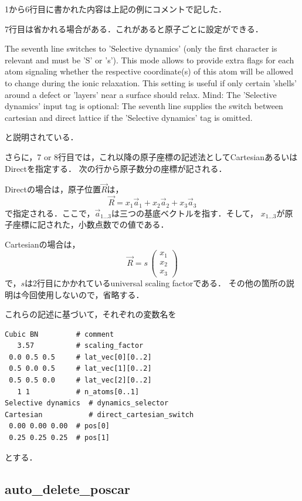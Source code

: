 \documentclass[11pt,dvipdfmx]{jsarticle}
\begin{document}
1から6行目に書かれた内容は上記の例にコメントで記した．

7行目は省かれる場合がある．これがあると原子ごとに設定ができる．

The seventh line switches to 'Selective dynamics' (only the first
character is relevant and must be 'S' or 's'). This mode allows to
provide extra flags for each atom signaling whether the respective
coordinate(s) of this atom will be allowed to change during the ionic
relaxation. This setting is useful if only certain 'shells' around a
defect or 'layers' near a surface should relax. Mind: The 'Selective
dynamics' input tag is optional: The seventh line supplies the switch
between cartesian and direct lattice if the 'Selective dynamics' tag is
omitted.

と説明されている．

さらに，7 or
8行目では，これ以降の原子座標の記述法としてCartesianあるいはDirectを指定する．
次の行から原子数分の座標が記される．

Directの場合は，原子位置\(\overrightarrow{R}\)は， \[
\overrightarrow{R} = x_1 \overrightarrow{a}_1 +
x_2 \overrightarrow{a}_2 +
x_3 \overrightarrow{a}_3
\]
で指定される．ここで，\(\overrightarrow{a}_{1 \dots 3}\)は三つの基底ベクトルを指す．そして，
\(x_{1 \dots 3}\)が原子座標に記された，小数点数での値である．

Cartesianの場合は， \[
\overrightarrow{R} = s \,
\left(\begin{array}{cc}
x_1\\
x_2\\
x_3
\end{array}\right)
\] で，\(s\)は2行目にかかれているuniversal scaling factorである．
その他の箇所の説明は今回使用しないので，省略する．

これらの記述に基づいて，それぞれの変数名を

\begin{verbatim}
Cubic BN         # comment
   3.57          # scaling_factor
 0.0 0.5 0.5     # lat_vec[0][0..2]
 0.5 0.0 0.5     # lat_vec[1][0..2]
 0.5 0.5 0.0     # lat_vec[2][0..2]
   1 1           # n_atoms[0..1]
Selective dynamics  # dynamics_selector
Cartesian           # direct_cartesian_switch
 0.00 0.00 0.00  # pos[0]
 0.25 0.25 0.25  # pos[1]
\end{verbatim}

とする．

    \subsection{auto\_delete\_poscar}\label{auto_delete_poscar}
\end{document}
